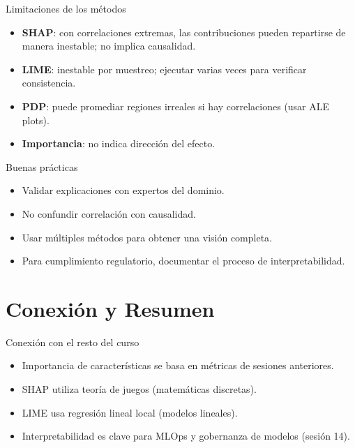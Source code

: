 \documentclass[aspectratio=169, 10pt, xcolor=table]{beamer}
\begin{document}
\begin{frame}{Limitaciones de los métodos}
    \begin{itemize}
        \item \textbf{SHAP}: con correlaciones extremas, las contribuciones pueden repartirse de manera inestable; no implica causalidad.
        \item \textbf{LIME}: inestable por muestreo; ejecutar varias veces para verificar consistencia.
        \item \textbf{PDP}: puede promediar regiones irreales si hay correlaciones (usar ALE plots).
        \item \textbf{Importancia}: no indica dirección del efecto.
    \end{itemize}
\end{frame}

\begin{frame}{Buenas prácticas}
    \begin{itemize}
        \item Validar explicaciones con expertos del dominio.
        \item No confundir correlación con causalidad.
        \item Usar múltiples métodos para obtener una visión completa.
        \item Para cumplimiento regulatorio, documentar el proceso de interpretabilidad.
    \end{itemize}
\end{frame}

\section{Conexión y Resumen}

\begin{frame}{Conexión con el resto del curso}
    \begin{itemize}
        \item Importancia de características se basa en métricas de sesiones anteriores.
        \item SHAP utiliza teoría de juegos (matemáticas discretas).
        \item LIME usa regresión lineal local (modelos lineales).
        \item Interpretabilidad es clave para MLOps y gobernanza de modelos (sesión 14).
    \end{itemize}
\end{frame}
\end{document}
